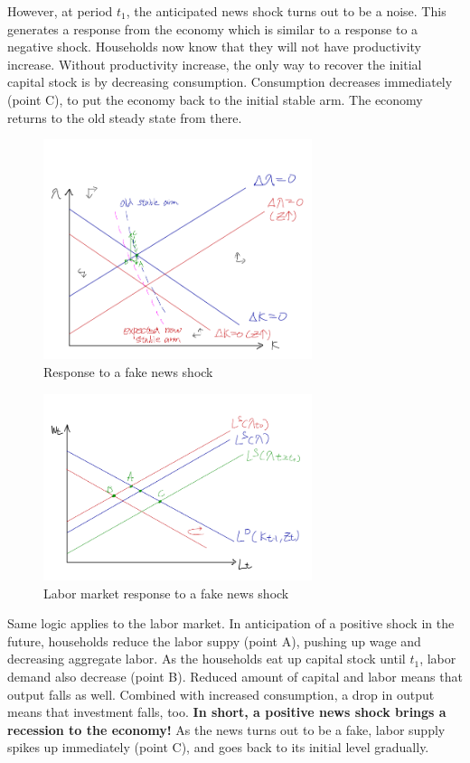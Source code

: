 \documentclass[11pt]{amsart}
\begin{document}
However, at period $t_1$, the anticipated news shock turns out to be a noise. This generates a response from the economy which is similar to a response to a negative shock. Households now know that they will not have productivity increase. Without productivity increase, the only way to recover the initial capital stock is by decreasing consumption. Consumption decreases immediately (point C), to put the economy back to the initial stable arm. The economy returns to the old steady state from there. 
\begin{figure}[H]
	\centering
	\includegraphics[width=0.7\textwidth]{3_1_Minki.png}
	\caption{Response to a fake news shock}
\end{figure}
\begin{figure}[H]
	\centering
	\includegraphics[width=0.7\textwidth]{3_2_Minki.png}
	\caption{Labor market response to a fake news shock}
\end{figure}
Same logic applies to the labor market. In anticipation of a positive shock in the future, households reduce the labor suppy (point A), pushing up wage and decreasing aggregate labor. As the households eat up capital stock until $t_1$, labor demand also decrease (point B). Reduced amount of capital and labor means that output falls as well. Combined with increased consumption, a drop in output means that investment falls, too. \textbf{In short, a positive news shock brings a recession to the economy!} As the news turns out to be a fake, labor supply spikes up immediately (point C), and goes back to its initial level gradually. 
\end{document}
